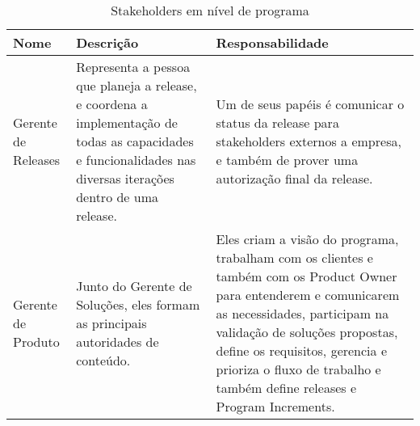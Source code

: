   \begin{table}[!htb]
    \centering
    \begin{tabular}{p{}p{6cm}p{6cm}} \hline
      \rowcolor{gray!50}
        \textbf{Nome}                    & \textbf{Descrição}                               & \textbf{Responsabilidade}                     \\
      \hline
        Gerente de Releases              & Representa a pessoa que planeja a release, e
                                           coordena a implementação de todas as capacidades
                                           e funcionalidades nas diversas iterações dentro
                                           de uma release.                                  & Um de seus papéis é comunicar o status da
                                                                                              release para stakeholders externos a empresa,
                                                                                              e também de prover uma autorização final da
                                                                                              release.                                      \\
        Gerente de Produto               & Junto do Gerente de Soluções, eles formam as
                                           principais autoridades de conteúdo.              & Eles criam a visão do programa, trabalham
                                                                                              com os clientes e também com os Product Owner
                                                                                              para entenderem e comunicarem as necessidades,
                                                                                              participam na validação de soluções propostas,
                                                                                              define os requisitos, gerencia e prioriza o
                                                                                              fluxo de trabalho e também define releases e
                                                                                              Program Increments.                           \\
    \end{tabular}
    \caption{Stakeholders em nível de programa}
  \end{table}

